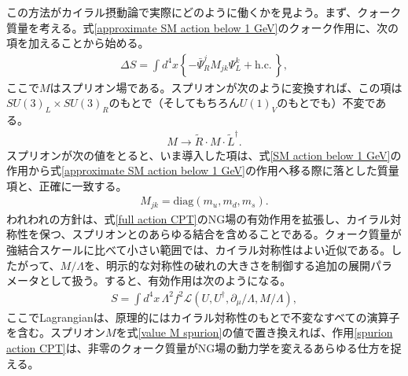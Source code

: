この方法がカイラル摂動論で実際にどのように働くかを見よう。まず、クォーク質量を考える。式\eqref{approximate SM action below 1 GeV}のクォーク作用に、次の項を加えることから始める。
%
\begin{align}
	\Delta S = \int d^4 x \left\{- \bar \Psi^j_R M_{jk} \Psi_L^k + \mbox{h.c.} \,  \right\} ,
\end{align}
%
ここで$M$はスプリオン場である。スプリオンが次のように変換すれば、この項は$SU(3)_L\times SU(3)_R$のもとで（そしてもちろん$U(1)_V$のもとでも）不変である。
%
\begin{align}
	 M \to \tilde R \cdot M \cdot \tilde L^\dag .
\end{align}
%
スプリオンが次の値をとると、いま導入した項は、式\eqref{SM action below 1 GeV}の作用から式\eqref{approximate SM action below 1 GeV}の作用へ移る際に落とした質量項と、正確に一致する。
%
\begin{align} \label{value M spurion}
	 M_{jk} = \mbox{diag} (m_u, m_d, m_s) .
\end{align}
%
われわれの方針は、式\eqref{full action CPT}のNG場の有効作用を拡張し、カイラル対称性を保つ、スプリオンとのあらゆる結合を含めることである。クォーク質量が強結合スケールに比べて小さい範囲では、カイラル対称性はよい近似である。したがって、$M/ \Lambda$を、明示的な対称性の破れの大きさを制御する追加の展開パラメータとして扱う。すると、有効作用は次のようになる。
%
\begin{align} \label{spurion action CPT}
	S = \int d^4 x \, \Lambda^2 f^2 \mathcal{L} (U, U^\dag,\partial_\mu / \Lambda, M/\Lambda) , 
\end{align}
%
ここでLagrangianは、原理的にはカイラル対称性のもとで不変なすべての演算子を含む。スプリオン$M$を式\eqref{value M spurion}の値で置き換えれば、作用\eqref{spurion action CPT}は、非零のクォーク質量がNG場の動力学を変えるあらゆる仕方を捉える。

